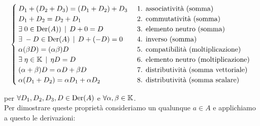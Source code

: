 \begin{equation}
	\begin{cases}
		D_{1} + (D_{2} + D_{3}) = (D_{1} + D_{2}) + D_{3} & \text{ 1. associatività (somma) }\\
		D_{1} + D_{2} = D_{2} + D_{1} & \text{ 2. commutatività (somma) }\\
		\exists \; 0 \in \operatorname{Der}(A)) \, \mid \, D + 0 = D & \text{ 3. elemento neutro (somma) }\\
		\exists \; - D \in \operatorname{Der}(A) \, \mid \, D + (- D) = 0 & \text{ 4. inverso (somma) }\\
		\alpha (\beta D) = (\alpha \beta) D & \text{ 5. compatibilità (moltiplicazione) }\\
		\exists \; \eta \in \mathbb{K} \, \mid \, \eta D = D & \text{ 6. elemento neutro (moltiplicazione) }\\
		(\alpha + \beta) D = \alpha D + \beta D & \text{ 7. distributività (somma vettoriale) }\\
		\alpha (D_{1} + D_{2}) = \alpha D_{1} + \alpha D_{2} & \text{ 8. distributività (somma scalare) }
	\end{cases}
\end{equation}

per $ \forall D_{1}, D_{2}, D_{3}, D \in \operatorname{Der}(A) $ e $ \forall \alpha, \beta \in \mathbb{K} $.\\
Per dimostrare queste proprietà consideriamo un qualunque $ a \in A $ e applichiamo a questo le derivazioni:

